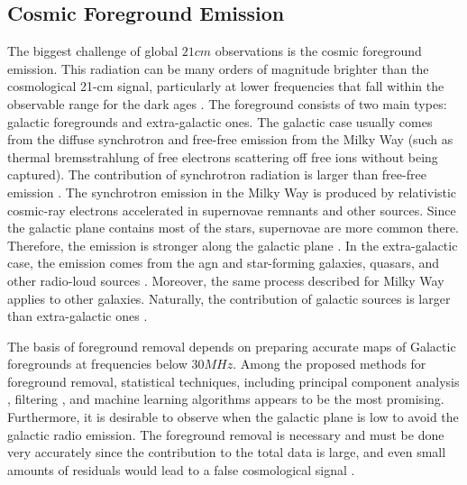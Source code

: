 \documentclass[12pt, TexShade, letterpaper]{report}
\begin{document}
\subsection{Cosmic Foreground Emission}
The biggest challenge of global $21cm$ observations is the cosmic foreground emission. This radiation can be many orders of magnitude brighter than the cosmological 21-cm signal, particularly at lower frequencies that fall within the observable range for the dark ages \cite{thesis_pamela}. The foreground consists of two main types:
galactic foregrounds and extra-galactic ones. The galactic case usually comes from the diffuse synchrotron and free-free emission from the Milky Way (such as thermal bremsstrahlung of free electrons scattering off free ions without being captured). The contribution of synchrotron radiation is larger than free-free emission \cite{pritchard_mcmc, reionization_old}. The synchrotron emission in the Milky Way is produced by relativistic cosmic-ray electrons accelerated in supernovae remnants and other sources. Since the galactic plane contains most of the stars, supernovae are more common there. Therefore, the emission is stronger along the galactic plane \cite{thesis_shedding}.
In the extra-galactic case, the emission comes from the \gls{agn} and star-forming galaxies, quasars, and other radio-loud sources \cite{book_foreground}. Moreover, the same process described for Milky Way applies to other galaxies. Naturally, the contribution of galactic sources is larger than extra-galactic ones \cite{pritchard_mcmc, reionization_old}.\par
The basis of foreground removal depends on preparing accurate maps of Galactic foregrounds at frequencies below $30MHz$. Among the proposed methods for foreground removal, statistical techniques, including principal component analysis \cite{principal_component}, filtering \cite{filtering}, and machine learning algorithms \cite{removal_deep_learning} appears to be the most promising. Furthermore, it is desirable to observe when the galactic plane is low to avoid the galactic radio emission\cite{leda_design}.
The foreground removal is necessary and must be done very accurately since the contribution to the total data is large, and even small amounts of residuals would lead to a false cosmological signal \cite{thesis_pamela}.\par
\end{document}
